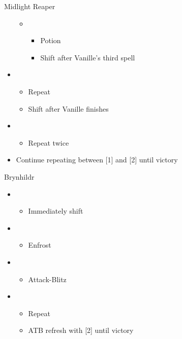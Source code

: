 \begin{multicols}{2}
\begin{battle}{Midlight Reaper}
\begin{itemize}
\begin{itemize}
\begin{itemize}
        \end{itemize}
        \item \sixth
        \begin{itemize}
            \item Potion
            \item Shift after Vanille's third spell
        \end{itemize}
    \end{itemize}
    \item \first
    \begin{itemize}
        \item Repeat
        \item Shift after Vanille finishes
    \end{itemize}
    \item \second
    \begin{itemize}
        \item Repeat twice
    \end{itemize}
    \item Continue repeating between [1] and [2] until victory
\end{itemize}
\end{battle}

\begin{battle}{Brynhildr}
\begin{itemize}
    \item \first
    \begin{itemize}
        \item Immediately shift
    \end{itemize}
    \item \third
    \begin{itemize}
        \item Enfrost
    \end{itemize}
    \item \first
    \begin{itemize}
        \item Attack-Blitz
    \end{itemize}
    \item \second
    \begin{itemize}
        \item Repeat
        \item ATB refresh with [2] until victory
    \end{itemize}
\end{itemize}
\end{battle}
\end{multicols}